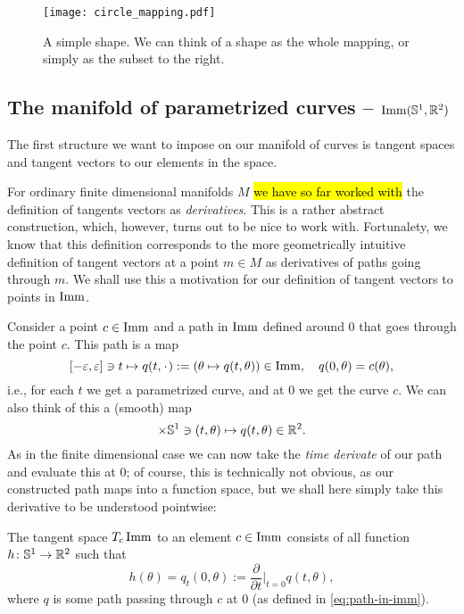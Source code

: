 \begin{figure}
  \centerline{\texttt{[image: circle\_mapping.pdf]}}
  \caption{A simple shape. We can think of a shape as the whole
    mapping, or simply as the subset to the right.}
  \label{fig:circle-mapping}
\end{figure}

\subsection{The manifold of parametrized curves -- $\mathop{}\!\mathrm{Imm}(\mathbb{S}^1, \mathbb{R}^2)$}
\label{sec:parametrized-curves}

The first structure we want to impose on our manifold of curves is tangent spaces and tangent vectors to our elements in the space.

For ordinary finite dimensional manifolds $M$ \hl{we have so far worked with} the definition of tangents vectors as \textit{derivatives}. This is a rather abstract construction, which, however, turns out to be nice to work with. Fortunalety, we know that this definition corresponds to the more geometrically intuitive definition of tangent vectors at a point $m \in M$ as derivatives of paths going through $m$. We shall use this a motivation for our definition of tangent vectors to points in $\mathop{}\!\mathrm{Imm}$.

Consider a point $c\in \mathop{}\!\mathrm{Imm}$ and a path in $\mathop{}\!\mathrm{Imm}$ defined around $0$ that goes through the point $c$. This path is a map
\begin{equation}
  \label{eq:path-in-imm}
  [-\epsilon, \epsilon] \ni t \mapsto  q(t, \blank) :=  (\theta\mapsto q(t, \theta)) \in \I,
  \quad q(0,\theta) = c(\theta),
\end{equation}
i.e., for each $t$ we get a parametrized curve, and at 0 we get the curve $c$. We can also think of this a (smooth) map
\begin{equation*}
  [-\epsilon, \epsilon] \times \S^1  \ni (t, \theta) \mapsto q(t, \theta) \in \R^2.
\end{equation*}
As in the finite dimensional case we can now take the \textit{time derivate} of our path and evaluate this at 0; of course, this is technically not obvious, as our constructed path maps into a function space, but we shall here simply take this derivative to be understood pointwise:

\begin{definition}
  The tangent space $T_{c}\mathop{}\!\mathrm{Imm}$ to an element $c \in \mathop{}\!\mathrm{Imm}$ consists of all function
  $h\colon \mathbb{S}^1 \rightarrow \mathbb{R}^2$ such that
  \begin{equation*}
    h(\theta) = q_t(0, \theta) := \frac{\partial }{\partial t} \bigg\vert_{t=0} q(t,\theta),
  \end{equation*}
  where $q$ is some path passing through $c$ at 0 (as defined in \eqref{eq:path-in-imm}).
\end{definition}

